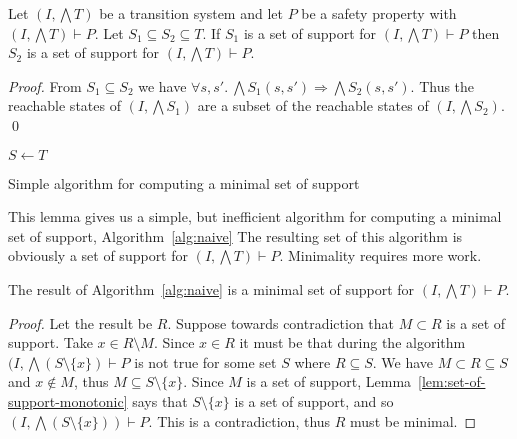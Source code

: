 \begin{lemma}
  \label{lem:set-of-support-monotonic}
  Let $(I, \bigwedge T)$ be a transition system and let $P$ be a
  safety property with $(I, \bigwedge T)\vdash P$. Let $S_1 \subseteq
  S_2 \subseteq T$. If $S_1$ is a set of support for $(I, \bigwedge
  T)\vdash P$ then $S_2$ is a set of support for $(I, \bigwedge T)\vdash P$.
\end{lemma}
\begin{proof}
  From $S_1 \subseteq S_2$ we have $\forall s, s'.~ \bigwedge
  S_1(s,s') \Rightarrow \bigwedge S_2(s, s')$. Thus the reachable
  states of $(I, \bigwedge S_1)$ are a subset of the reachable states
  of $(I, \bigwedge S_2)$. \qed
\end{proof}

\begin{algorithm}
  \BlankLine
  $S \leftarrow T$ \\
   {
  }
\caption{Simple algorithm for computing a minimal set of support}
\label{alg:naive}
\end{algorithm}

This lemma gives us a simple, but inefficient algorithm for computing
a minimal set of support, Algorithm~\ref{alg:naive}
 The resulting set
of this algorithm is obviously a set of support for $(I, \bigwedge
T)\vdash P$. Minimality requires more work.

\begin{lemma}
  The result of Algorithm~\ref{alg:naive} is a minimal set of support
  for $(I, \bigwedge T)\vdash P$.
\end{lemma}
\begin{proof}
  Let the result be $R$. Suppose towards contradiction that $M \subset
  R$ is a set of support. Take $x \in R\setminus M$. Since $x \in R$
  it must be that during the algorithm $(I,
  \bigwedge(S\setminus\{x\})\vdash P$ is not true for some set $S$
  where $R \subseteq S$. We have $M \subset R \subseteq S$ and
  $x\not\in M$, thus $M \subseteq S\setminus \{x\}$. Since $M$ is a
  set of support, Lemma~\ref{lem:set-of-support-monotonic} says that
  $S\setminus \{x\}$ is a set of support, and so $(I, \bigwedge
  (S\setminus\{x\}))\vdash P$. This is a contradiction, thus $R$ must
  be minimal.
\end{proof}

